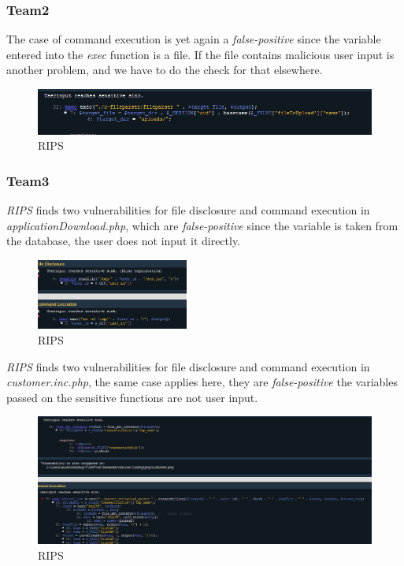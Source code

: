 \documentclass[headsepline,footsepline,footinclude=false,oneside,fontsize=11pt,paper=a4,listof=totoc,bibliography=totoc]{scrbook} %
\begin{document}
\subsubsection{Team2}
The case of command execution is yet again a \textit{false-positive} since the variable entered into the \textit{exec} function is a file. If the file contains malicious user input is another problem, and we have to do the check for that elsewhere.\\

\begin{figure}[H]
	\centering
	\includegraphics[width=150mm]{logos/command1.jpg}
	\caption{RIPS \label{overflow}}
\end{figure}
 
\pagebreak
\subsubsection{Team3}
\textit{RIPS} finds two vulnerabilities for file disclosure and command execution in \textit{applicationDownload.php}, which are \textit{false-positive} since the variable is taken from the database, the user does not input it directly.
\begin{figure}[H]
	\centering
	\includegraphics[width=50mm]{logos/download3.jpg}
	\caption{RIPS \label{overflow}}
\end{figure}
\textit{RIPS} finds two vulnerabilities for file disclosure and command execution in \textit{customer.inc.php}, the same case applies here, they are \textit{false-positive} the variables passed on the sensitive functions are not user input.
\begin{figure}[H]
	\centering
	\includegraphics[width=150mm]{logos/trans3.jpg}
	\caption{RIPS \label{overflow}}
\end{figure}
\pagebreak
\end{document}
